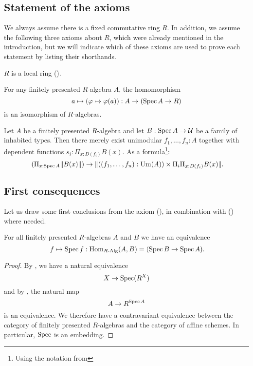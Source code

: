 \subsection{Statement of the axioms}

We always assume there is a fixed commutative ring $R$.
In addition, we assume the following three axioms about $R$,
which were already mentioned in the introduction,
but we will indicate which of these axioms are used to prove each statement
by listing their shorthands.

\begin{axiom}[Loc]%
  \label{loc}
  $R$ is a local ring ().
\end{axiom}

\begin{axiom}[SQC]%
  \label{sqc}
  For any finitely presented $R$-algebra $A$, the homomorphism
  \[ a \mapsto (\varphi\mapsto \varphi(a)) : A \to (\operatorname{Spec} A \to R)\]
  is an isomorphism of $R$-algebras.
\end{axiom}

\begin{axiom}[Z-choice]%
  \label{Z-choice}
  Let $A$ be a finitely presented $R$-algebra
  and let $B : \operatorname{Spec} A \to \mathcal{U}$ be a family of inhabited types.
  Then there merely exist unimodular $f_1, \dots, f_n : A$
  together with dependent functions $s_i : \Pi_{x : D(f_i)} B(x)$.
  As a formula\footnote{Using the notation from }:
  \[ (\Pi_{x : \Spec A} \propTrunc{B(x)}) \to
     \propTrunc{ ((f_1,\dots,f_n):\Um(A)) \times
      \Pi_i \Pi_{x : D(f_i)} B(x) }
     \rlap{.}
  \]
\end{axiom}

\subsection{First consequences}

Let us draw some first conclusions from the axiom (),
in combination with () where needed.

\begin{proposition}%
  \label{spec-embedding}
  For all finitely presented $R$-algebras $A$ and $B$ we have an equivalence
  \[
    f\mapsto \Spec f : \Hom_{\Alg{R}}(A,B) = (\Spec B \to \Spec A)
    \rlap{.}
  \]
\end{proposition}

\begin{proof}
  By , we have a natural equivalence
  \[
    X\to \operatorname{Spec} (R^X)
  \]
  and by , the natural map
  \[
    A\to R^{\operatorname{Spec} A}
  \]
  is an equivalence.
  We therefore have a contravariant equivalence between
  the category of finitely presented $R$-algebras
  and the category of affine schemes.
  In particular, $\operatorname{Spec}$ is an embedding.
\end{proof}

